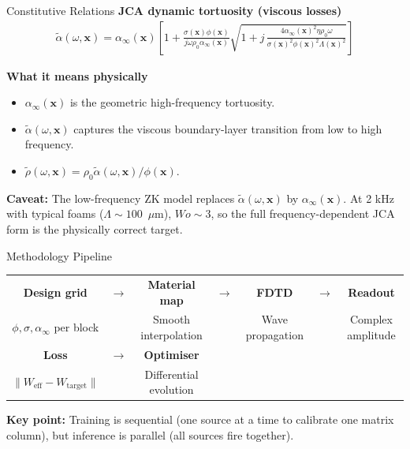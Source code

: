 \documentclass[aspectratio=169,11pt]{beamer}
\begin{document}
\begin{frame}{Constitutive Relations}
  \small
  \textbf{JCA dynamic tortuosity (viscous losses)}
  \begin{align*}
    \tilde{\alpha}(\omega, \mathbf{x}) = \alpha_\infty(\mathbf{x}) \left[
      1 + \frac{\sigma(\mathbf{x}) \phi(\mathbf{x})}{j \omega \rho_0 \alpha_\infty(\mathbf{x})}
      \sqrt{1 + j \, \frac{4 \alpha_\infty(\mathbf{x})^2 \eta \rho_0 \omega}{\sigma(\mathbf{x})^2 \phi(\mathbf{x})^2 \Lambda(\mathbf{x})^2}}
    \right]
  \end{align*}

  \vspace{0.2cm}
  \textbf{What it means physically}
  \begin{itemize}
    \item $\alpha_\infty(\mathbf{x})$ is the geometric high-frequency tortuosity.
    \item $\tilde{\alpha}(\omega, \mathbf{x})$ captures the viscous boundary-layer transition from low to high frequency.
    \item $\tilde{\rho}(\omega, \mathbf{x}) = \rho_0 \tilde{\alpha}(\omega, \mathbf{x}) / \phi(\mathbf{x})$.
  \end{itemize}

  \vspace{0.2cm}
  \textcolor{gdpBurgundy}{\textbf{Caveat:} The low-frequency ZK model replaces $\tilde{\alpha}(\omega, \mathbf{x})$ by $\alpha_\infty(\mathbf{x})$. At 2 kHz with typical foams ($\Lambda \sim 100$~$\mu$m), $Wo \sim 3$, so the full frequency-dependent JCA form is the physically correct target.}
\end{frame}

\begin{frame}{Methodology Pipeline}
  \begin{center}
    \small
    \begin{tabular}{ccccccc}
      \textbf{Design grid} & $\to$ & \textbf{Material map} & $\to$ & \textbf{FDTD} & $\to$ & \textbf{Readout} \\[0.15cm]
      $\phi, \sigma, \alpha_\infty$ per block & & Smooth interpolation & & Wave propagation & & Complex amplitude \\[0.4cm]
      \textbf{Loss} & $\to$ & \textbf{Optimiser} \\[0.15cm]
      $\|W_\text{eff} - W_\text{target}\|$ & & Differential evolution
    \end{tabular}
  \end{center}

  \vspace{0.4cm}
  \textbf{Key point:} Training is sequential (one source at a time to calibrate one matrix column), but inference is parallel (all sources fire together).
\end{frame}
\end{document}
